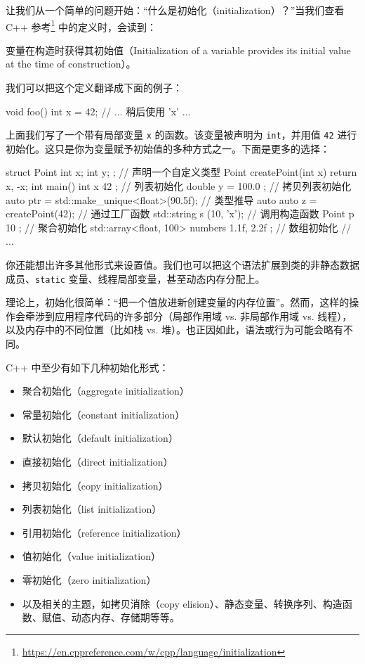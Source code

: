 让我们从一个简单的问题开始：“什么是初始化（initialization）？”当我们查看 C++ 参考\footnote{\url{https://en.cppreference.com/w/cpp/language/initialization}} 中的定义时，会读到：

\begin{myQuote}
变量在构造时获得其初始值（Initialization of a variable provides its initial value at the time of construction）。
\end{myQuote}

我们可以把这个定义翻译成下面的例子：

\begin{codebox}[cpp]
void foo() {
int x = 42;
// ... 稍后使用 'x' ...
}
\end{codebox}

上面我们写了一个带有局部变量 \texttt{x} 的函数。该变量被声明为 \texttt{int}，并用值 \texttt{42} 进行初始化。这只是你为变量赋予初始值的多种方式之一。下面是更多的选择：

\begin{codebox}[cpp]
struct Point { int x; int y; };
// 声明一个自定义类型
Point createPoint(int x) { return {x, -x}; }
int main() {
int x { 42 };
// 列表初始化
double y = { 100.0 };
// 拷贝列表初始化
auto ptr = std::make_unique<float>(90.5f); // 类型推导 auto
auto z = createPoint(42);
// 通过工厂函数
std::string s (10, 'x');
// 调用构造函数
Point p { 10 };
// 聚合初始化
std::array<float, 100> numbers { 1.1f, 2.2f }; // 数组初始化
// ...
}
\end{codebox}

你还能想出许多其他形式来设置值。我们也可以把这个语法扩展到类的非静态数据成员、\texttt{static} 变量、线程局部变量，甚至动态内存分配上。

理论上，初始化很简单：“把一个值放进新创建变量的内存位置”。然而，这样的操作会牵涉到应用程序代码的许多部分（局部作用域 vs. 非局部作用域 vs. 线程），以及内存中的不同位置（比如栈 vs. 堆）。也正因如此，语法或行为可能会略有不同。

C++ 中至少有如下几种初始化形式：

\begin{itemize}
\item 聚合初始化（aggregate initialization）
\item 常量初始化（constant initialization）
\item 默认初始化（default initialization）
\item 直接初始化（direct initialization）
\item 拷贝初始化（copy initialization）
\item 列表初始化（list initialization）
\item 引用初始化（reference initialization）
\item 值初始化（value initialization）
\item 零初始化（zero initialization）
\item 以及相关的主题，如拷贝消除（copy elision）、静态变量、转换序列、构造函数、赋值、动态内存、存储期等等。
\end{itemize}


